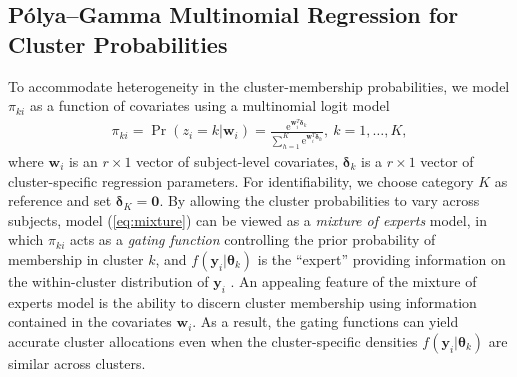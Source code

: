 \documentclass[useAMS,usenatbib,referee]{biom}
\begin{document}
\subsection{P\'olya--Gamma Multinomial Regression for Cluster Probabilities}
\label{s:multinom}
To accommodate heterogeneity in the cluster-membership probabilities, we model $\pi_{ki}$ as a function of covariates using a multinomial logit model
\begin{eqnarray}
\label{eq:pik}
\pi_{ki} = \Pr(z_i = k|\mathbf{w}_i) = \frac{\text{e}^{\mathbf{w}_i^T \boldsymbol\delta_k}}{\sum_{h = 1}^K \text{e}^{\mathbf{w}_i^T \boldsymbol\delta_{h}}},~ k=1,\ldots,K,
\end{eqnarray}
where $\mathbf{w}_i$ is an $r\times 1$ vector of subject-level covariates, $\boldsymbol\delta_k$ is a $r\times 1$ vector of cluster-specific regression parameters. For identifiability, we choose category $K$ as reference and set $\boldsymbol\delta_K = \mathbf{0}$. By allowing the cluster probabilities to vary across subjects, model (\ref{eq:mixture}) can be viewed as a \textit{mixture of experts} model, in which $\pi_{ki}$ acts as a \textit{gating function} controlling the prior probability of membership in cluster $k$, and $f(\mathbf{y}_i|\boldsymbol\theta_k)$ is the ``expert'' providing information on the within-cluster distribution of $\mathbf{y}_i$ \citep{bishop2006pattern}. An appealing feature of the mixture of experts model is the ability to discern cluster membership using information contained in the covariates $\mathbf{w}_i$. As a result, the gating functions can yield accurate cluster allocations even when the cluster-specific densities $f(\mathbf{y}_i | \boldsymbol\theta_k)$ are similar across clusters.
\end{document}
